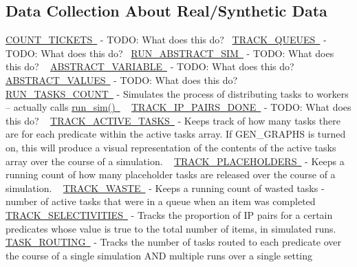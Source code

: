  \hypertarget{toggles_data2}{}\subsection{Data Collection About Real/\+Synthetic Data}\label{toggles_data2}
\mbox{\hyperlink{}{C\+O\+U\+N\+T\+\_\+\+T\+I\+C\+K\+E\+TS }} -\/ T\+O\+DO\+: What does this do?~\newline
 \mbox{\hyperlink{}{T\+R\+A\+C\+K\+\_\+\+Q\+U\+E\+U\+ES }} -\/ T\+O\+DO\+: What does this do?~\newline
\mbox{\hyperlink{}{R\+U\+N\+\_\+\+A\+B\+S\+T\+R\+A\+C\+T\+\_\+\+S\+IM }} -\/ T\+O\+DO\+: What does this do? ~\newline
 \mbox{\hyperlink{}{A\+B\+S\+T\+R\+A\+C\+T\+\_\+\+V\+A\+R\+I\+A\+B\+LE }} -\/ T\+O\+DO\+: What does this do? ~\newline
 \mbox{\hyperlink{}{A\+B\+S\+T\+R\+A\+C\+T\+\_\+\+V\+A\+L\+U\+ES }} -\/ T\+O\+DO\+: What does this do? ~\newline
 \mbox{\hyperlink{}{R\+U\+N\+\_\+\+T\+A\+S\+K\+S\+\_\+\+C\+O\+U\+NT }} -\/ Simulates the process of distributing tasks to workers -- actually calls \mbox{\hyperlink{}{run\+\_\+sim() }} ~\newline
 \mbox{\hyperlink{}{T\+R\+A\+C\+K\+\_\+\+I\+P\+\_\+\+P\+A\+I\+R\+S\+\_\+\+D\+O\+NE }} -\/ T\+O\+DO\+: What does this do? ~\newline
 \mbox{\hyperlink{}{T\+R\+A\+C\+K\+\_\+\+A\+C\+T\+I\+V\+E\+\_\+\+T\+A\+S\+KS }} -\/ Keeps track of how many tasks there are for each predicate within the active tasks array. If G\+E\+N\+\_\+\+G\+R\+A\+P\+HS is turned on, this will produce a visual representation of the contents of the active tasks array over the course of a simulation. ~\newline
 \mbox{\hyperlink{}{T\+R\+A\+C\+K\+\_\+\+P\+L\+A\+C\+E\+H\+O\+L\+D\+E\+RS }} -\/ Keeps a running count of how many placeholder tasks are released over the course of a simulation. ~\newline
 \mbox{\hyperlink{}{T\+R\+A\+C\+K\+\_\+\+W\+A\+S\+TE }} -\/ Keeps a running count of wasted tasks -\/ number of active tasks that were in a queue when an item was completed ~\newline
 \mbox{\hyperlink{}{T\+R\+A\+C\+K\+\_\+\+S\+E\+L\+E\+C\+T\+I\+V\+I\+T\+I\+ES }} -\/ Tracks the proportion of IP pairs for a certain predicates whose value is true to the total number of items, in simulated runs. ~\newline
 \mbox{\hyperlink{}{T\+A\+S\+K\+\_\+\+R\+O\+U\+T\+I\+NG }} -\/ Tracks the number of tasks routed to each predicate over the course of a single simulation A\+ND multiple runs over a single setting ~\newline
